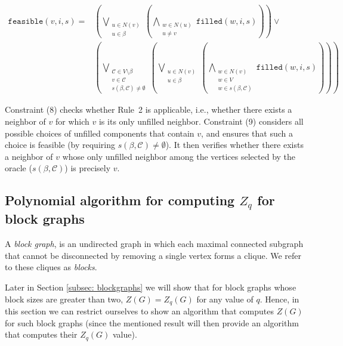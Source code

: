 \documentclass[11pt]{article}
\theoremstyle{plain}
\theoremstyle{definition}
\theoremstyle{remark}
\begin{document}
\begin{align}
    \texttt{feasible}(v,i,s) = &(\bigvee_{\substack{u \in N(v) \\ u \in \beta}} (\bigwedge_{\substack{w\in N(u) \\ u \neq v}}\texttt{filled}(w, i, s))) \vee \\
    &(\bigvee_{\substack{\mathcal{C} \in V\setminus\beta \\ v \in \mathcal{C} \\ s(\beta, \mathcal{C}) \neq \emptyset}}(\bigvee_{\substack{u\in N(v) \\ u \in \beta}} (\bigwedge_{\substack{w\in N(v) \\ w \in V \\ w \in s(\beta, \mathcal{C})}} \texttt{filled}(w,i,s) )))
\end{align}

Constraint (8) checks whether Rule~2 is applicable, i.e., whether there exists a neighbor of $v$ for which $v$ is its only unfilled neighbor.  
Constraint (9) considers all possible choices of unfilled components that contain $v$, and ensures that such a choice is feasible (by requiring $s(\beta, \mathcal{C}) \neq \emptyset$). It then verifies whether there exists a neighbor of $v$ whose only unfilled neighbor among the vertices selected by the oracle ($s(\beta, \mathcal{C})$) is precisely $v$.

\subsection{Polynomial algorithm for computing \texorpdfstring{\(Z_q\)}{Zq} for block graphs}\label{subsec:polyalgoblckgraphs}

A \textit{block graph}, is an undirected graph in which each maximal connected subgraph that cannot be disconnected by removing a single vertex forms a clique. We refer to these cliques as \textit{blocks}.

Later in Section \ref{subsec: blockgraphs} we will show that for block graphs whose block sizes are greater than two, $Z(G) = Z_q(G)$ for any value of $q$. Hence, in this section we can restrict ourselves to show an algorithm that computes $Z(G)$ for such block graphs (since the mentioned result will then provide an algorithm that computes their $Z_q(G)$ value).
\end{document}
